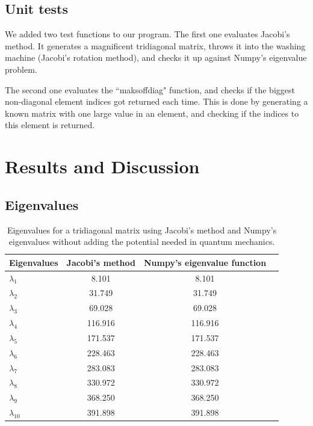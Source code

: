 \documentclass{article}
\begin{document}
\subsection{Unit tests}

We added two test functions to our program. The first one evaluates Jacobi's method. It generates a magnificent tridiagonal matrix, throws it into the washing machine (Jacobi's rotation method), and checks it up against Numpy's eigenvalue problem.

The second one evaluates the ``maksoffdiag" function, and checks if the biggest non-diagonal element indices got returned each time. This is done by generating a known matrix with one large value in an element, and checking if the indices to this element is returned.

\section{Results and Discussion}

\subsection{Eigenvalues}

\begin{table}[H]
    \centering
    \begin{tabular}{|l|c|c|r|}
    \hline
     Eigenvalues & Jacobi's method & Numpy's eigenvalue function\\
     \hline
      $\lambda_1$  & 8.101  & 8.101 \\
      $\lambda_2$  & 31.749  & 31.749 \\
      $\lambda_3$  & 69.028  & 69.028 \\
      $\lambda_4$  & 116.916  & 116.916 \\
      $\lambda_5$  & 171.537 & 171.537 \\
      $\lambda_6$  & 228.463  & 228.463 \\
      $\lambda_7$  & 283.083  & 283.083 \\
      $\lambda_8$  & 330.972 & 330.972 \\
      $\lambda_9$  & 368.250 & 368.250 \\
      $\lambda_{10}$ & 391.898 & 391.898 \\
      \hline
    \end{tabular}
    \caption{Eigenvalues for a tridiagonal matrix using Jacobi's method and Numpy's eigenvalues without adding the potential needed in quantum mechanics.}
    \label{eigenvalues}
\end{table}
\end{document}

